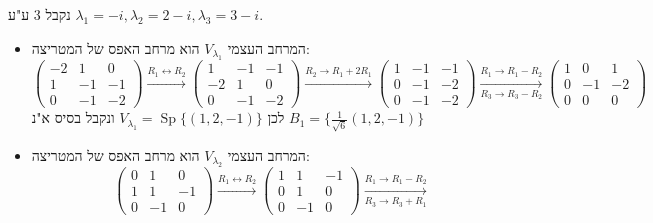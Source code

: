 \documentclass{article}
\DeclareMathOperator{\Sp}{Sp}
\begin{document}
נקבל 3 ע"ע $\lambda_1=-i, \lambda_2=2-i, \lambda_3=3-i$.
\begin{itemize}
    \item המרחב העצמי $V_{\lambda_1}$ הוא מרחב האפס של המטריצה: \\
          \[
              \begin{pmatrix}
                  -2 & 1  & 0  \\
                  1  & -1 & -1 \\
                  0  & -1 & -2
              \end{pmatrix} \xrightarrow[]{R_1\leftrightarrow R_2}
              \begin{pmatrix}
                  1  & -1 & -1 \\
                  -2 & 1  & 0  \\
                  0  & -1 & -2
              \end{pmatrix} \xrightarrow{R_2\rightarrow R_1+2R_1}
              \begin{pmatrix}
                  1 & -1 & -1 \\
                  0 & -1 & -2 \\
                  0 & -1 & -2
              \end{pmatrix} \xrightarrow[R_3\rightarrow R_3-R_2]{R_1\rightarrow R_1-R_2}
              \begin{pmatrix}
                  1 & 0  & 1  \\
                  0 & -1 & -2 \\
                  0 & 0  & 0
              \end{pmatrix}
          \]
          לכן $V_{\lambda_1}=\Sp\{ (1, 2, -1) \}$ ונקבל בסיס א"נ $B_1=\{ \frac{1}{\sqrt{6}}(1, 2, -1) \}$
    \item המרחב העצמי $V_{\lambda_2}$ הוא מרחב האפס של המטריצה: \\
          \[
              \begin{pmatrix}
                  0 & 1  & 0  \\
                  1 & 1  & -1 \\
                  0 & -1 & 0
              \end{pmatrix} \xrightarrow[]{R_1\leftrightarrow R_2}
              \begin{pmatrix}
                  1 & 1  & -1 \\
                  0 & 1  & 0  \\
                  0 & -1 & 0
              \end{pmatrix} \xrightarrow[R_3\rightarrow R_3+R_1]{R_1\rightarrow R_1-R_2}
\]
\end{itemize}
\end{document}
